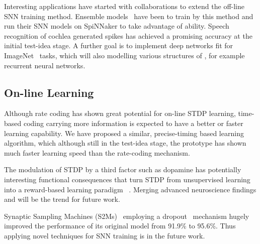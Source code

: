 Interesting applications have started with collaborations to extend the off-line SNN training method.
Ensemble models~\citep{rokach2010ensemble} have been \DIFdelbegin {}\DIFdelend \DIFaddbegin {}\DIFaddend to train by this method and run their SNN models on SpiNNaker to take advantage of \DIFdelbegin {}\DIFdelend \DIFaddbegin {}\DIFaddend ability.
Speech recognition of cochlea generated spikes has achieved a promising accuracy at the initial test-idea stage.
A further goal is to implement deep networks fit for ImageNet~\citep{deng2009imagenet} tasks, which will also \DIFdelbegin {}\DIFdelend \DIFaddbegin {}\DIFaddend modelling various structures of \DIFdelbegin {}\DIFdelend \DIFaddbegin {}\DIFaddend , for example recurrent neural networks.


\subsection{On-line \DIFdelbegin {}\DIFdelend \DIFaddbegin {}\DIFaddend Learning}
Although rate coding has shown great potential for on-line STDP learning, time-based coding carrying more information is expected to have a better or faster learning capability.
We have proposed a similar, precise-timing based learning algorithm, which although still in the test-idea stage, the prototype has shown much faster learning speed than the rate-coding mechanism.

The modulation of STDP by a third factor such as dopamine has potentially interesting functional consequences that turn STDP from unsupervised learning into a reward-based learning paradigm~\citep{izhikevich2007solving} \DIFdelbegin {}\DIFdelend \DIFaddbegin {}\DIFaddend .
Merging advanced neuroscience findings and \DIFdelbegin {}\DIFdelend \DIFaddbegin {}\DIFaddend will be the trend for future work.


Synaptic Sampling Machines (S2Ms)~\citep{neftci2016stochastic} employing a dropout~\citep{srivastava2014dropout} mechanism \DIFaddbegin {}\DIFaddend hugely improved the performance of its original model from 91.9\% to 95.6\%.
Thus applying novel \DIFdelbegin {}\DIFdelend \DIFaddbegin {}\DIFaddend techniques for SNN training is in the future work.


